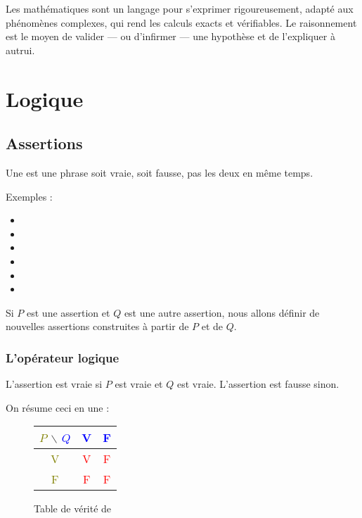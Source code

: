 \documentclass[11pt,class=report,crop=false]{standalone}
\begin{document}
\bigskip

Les mathématiques sont un langage pour s'exprimer rigoureusement, adapté aux phénomènes complexes,
qui rend les calculs exacts et vérifiables. Le raisonnement est le moyen de valider --- ou d'infirmer ---
une hypothèse et de l'expliquer à autrui.

\bigskip

\section{Logique}

\subsection{Assertions}

Une  est une phrase soit vraie, soit fausse, pas les deux en même temps.

Exemples :
\begin{itemize}
  \item {}
  \item {}
  \item {}
  \item {}
  \item {}
  \item {}
\end{itemize}


\bigskip

Si $P$ est une assertion et $Q$ est une autre assertion, nous allons définir de nouvelles assertions construites à partir de $P$ et de $Q$.

\subsubsection*{L'opérateur logique }


L'assertion  est vraie si $P$ est vraie et $Q$ est vraie.
L'assertion  est fausse sinon.

On résume ceci en une  :
\begin{figure}[H]
\centering
\begin{tabular}{c|c|c}
\textcolor{olive}{$P$} $\backslash$ \textcolor{blue}{$Q$} & \textcolor{blue}{V} & \textcolor{blue}{F} \\ \hline
\textcolor{olive}{V} & \textcolor{red}{V} & \textcolor{red}{F} \\ \hline
\textcolor{olive}{F} & \textcolor{red}{F} & \textcolor{red}{F} \\
\end{tabular}
\caption{Table de vérité de }
\end{figure}
\end{document}
